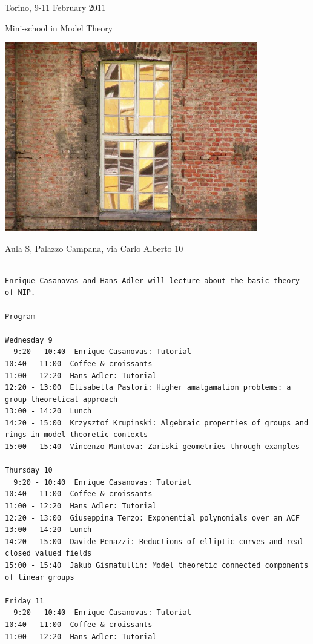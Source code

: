 \documentclass[10pt,a4paper]{article}
\begin{document}



\begin{center}
     \large\sf Torino, 9-11 February 2011 \ \par
      \Huge\sf Mini-school in Model Theory \ 

\includegraphics[width=110mm]{../Palazzo_Campana___Cortile2_by_dadexix86.jpg}%
\,

\large Aula S, Palazzo Campana, via Carlo Alberto 10

\end{center}

\vskip15mm
\begin{Verbatim}[fontfamily=helvetica]

Enrique Casanovas and Hans Adler will lecture about the basic theory of NIP.

Program 

Wednesday 9
  9:20 - 10:40  Enrique Casanovas: Tutorial
10:40 - 11:00  Coffee & croissants
11:00 - 12:20  Hans Adler: Tutorial
12:20 - 13:00  Elisabetta Pastori: Higher amalgamation problems: a group theoretical approach
13:00 - 14:20  Lunch
14:20 - 15:00  Krzysztof Krupinski: Algebraic properties of groups and rings in model theoretic contexts
15:00 - 15:40  Vincenzo Mantova: Zariski geometries through examples
 
Thursday 10
  9:20 - 10:40  Enrique Casanovas: Tutorial
10:40 - 11:00  Coffee & croissants
11:00 - 12:20  Hans Adler: Tutorial
12:20 - 13:00  Giuseppina Terzo: Exponential polynomials over an ACF
13:00 - 14:20  Lunch
14:20 - 15:00  Davide Penazzi: Reductions of elliptic curves and real closed valued fields
15:00 - 15:40  Jakub Gismatullin: Model theoretic connected components of linear groups
 
Friday 11
  9:20 - 10:40  Enrique Casanovas: Tutorial
10:40 - 11:00  Coffee & croissants
11:00 - 12:20  Hans Adler: Tutorial

\end{Verbatim}
\end{document}
